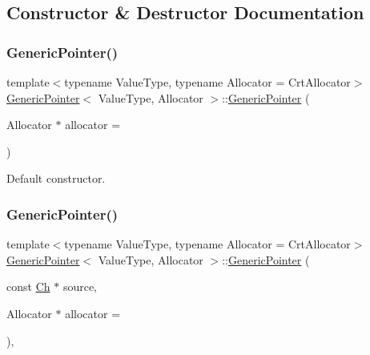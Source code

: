 \subsection{Constructor \& Destructor Documentation}
\mbox{\label{classGenericPointer_a5d85b7dc82719643e8f7adccd5a74fbe}} 
\subsubsection{\texorpdfstring{Generic\+Pointer()}{GenericPointer()}\hspace{0.1cm}{\footnotesize\ttfamily [1/6]}}
{\footnotesize\ttfamily template$<$typename Value\+Type, typename Allocator = Crt\+Allocator$>$ \\
\hyperlink{classGenericPointer}{Generic\+Pointer}$<$ Value\+Type, Allocator $>$\+::\hyperlink{classGenericPointer}{Generic\+Pointer} (\begin{DoxyParamCaption}\item[{Allocator $\ast$}]{allocator = {} }\end{DoxyParamCaption})\hspace{0.3cm}{\ttfamily [inline]}}



Default constructor. 

\mbox{\label{classGenericPointer_a4ad549b8a826c3c2dedf03fcc07be9b0}} 
\subsubsection{\texorpdfstring{Generic\+Pointer()}{GenericPointer()}\hspace{0.1cm}{\footnotesize\ttfamily [2/6]}}
{\footnotesize\ttfamily template$<$typename Value\+Type, typename Allocator = Crt\+Allocator$>$ \\
\hyperlink{classGenericPointer}{Generic\+Pointer}$<$ Value\+Type, Allocator $>$\+::\hyperlink{classGenericPointer}{Generic\+Pointer} (\begin{DoxyParamCaption}\item[{const \hyperlink{classGenericPointer_ab292356c11b4015c98d21b966b11f285}{Ch} $\ast$}]{source,  }\item[{Allocator $\ast$}]{allocator = {} }\end{DoxyParamCaption})\hspace{0.3cm}{\ttfamily [inline]}, {\ttfamily [explicit]}}



